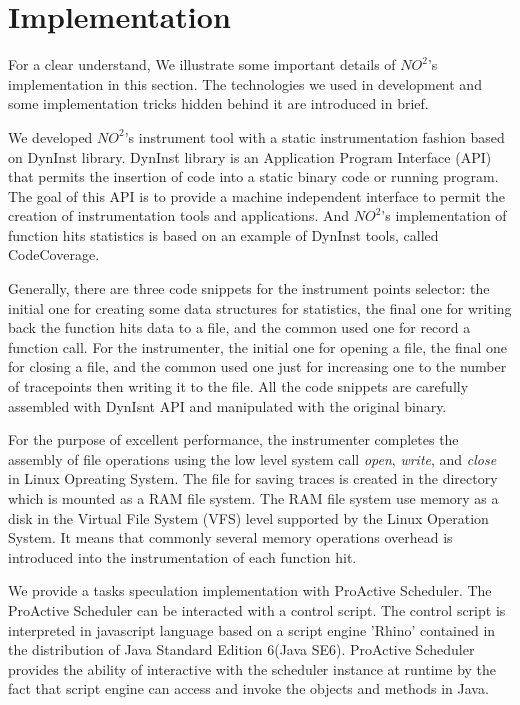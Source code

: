 \section{Implementation}

For a clear understand, We illustrate some important details of $NO^2$'s implementation in this section. The technologies we used in development and some implementation tricks hidden behind it are introduced in brief.

We developed $NO^2$'s instrument tool with a static instrumentation fashion based on DynInst library. DynInst library is an Application Program Interface (API) that permits the insertion of code into a static binary code or running program. The goal of this API is to provide a machine independent interface to permit the creation of instrumentation tools and applications. And $NO^2$'s implementation of function hits statistics is based on an example of DynInst tools, called CodeCoverage.

Generally, there are three code snippets for the instrument points selector: the initial one for creating some data structures for statistics, the final one for writing back the function hits data to a file, and the common used one for record a function call. For the instrumenter, the initial one for opening a file, the final one for closing a file, and the common used one just for increasing one to the number of tracepoints then writing it to the file. All the code snippets are carefully assembled with DynIsnt API and manipulated with the original binary.

For the purpose of excellent performance, the instrumenter completes the assembly of file operations using the low level system call \emph{open}, \emph{write}, and \emph{close} in Linux Opreating System. The file for saving traces is created in the directory which is mounted as a RAM file system. The RAM file system use memory as a disk in the Virtual File System (VFS) level supported by the Linux Operation System. It means that commonly several memory operations overhead is introduced into the instrumentation of each function hit.

We provide a tasks speculation implementation with ProActive Scheduler. The ProActive Scheduler can be interacted with a control script. The control script is interpreted in javascript language based on a script engine 'Rhino' contained in the distribution of Java Standard Edition 6(Java SE6). ProActive Scheduler provides the ability of interactive with the scheduler instance at runtime by the fact that script engine can access and invoke the objects and methods in Java.

